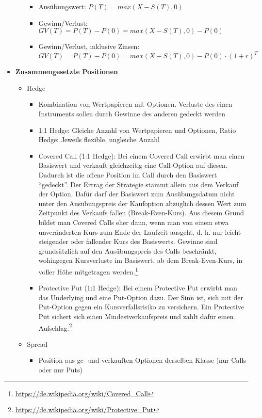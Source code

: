 \begin{itemize}
\begin{itemize}
\begin{itemize}
			\item Ausübungswert: \(P(T)=max(X-S(T),0)\)
			\item Gewinn/Verlust: \(GV(T)=P(T)-P(0) = max(X-S(T),0)-P(0)\)
			\item Gewinn/Verlust, inklusive Zinsen: \(GV(T)=P(T)-P(0) = max(X-S(T),0)-P(0) \cdot (1+r)^T\)
		\end{itemize}
	\end{itemize}
	\item \textbf{Zusammengesetzte Positionen}
	\begin{itemize}
		\item Hedge
		\begin{itemize}
			\item Kombination von Wertpapieren mit Optionen. Verluste des einen Instruments sollen durch Gewinne des anderen gedeckt werden
			\item 1:1 Hedge: Gleiche Anzahl von Wertpapieren und Optionen, Ratio Hedge: Jeweils flexible, ungleiche Anzahl
			\item Covered Call (1:1 Hedge): Bei einem Covered Call erwirbt man einen Basiswert und verkauft gleichzeitig eine Call-Option auf diesen. Dadurch ist die offene Position im Call durch den Basiswert "`gedeckt"'. Der Ertrag der Strategie stammt allein aus dem Verkauf der Option. Dafür darf der Basiswert zum Ausübungsdatum nicht unter den Ausübungspreis der Kaufoption abzüglich dessen Wert zum Zeitpunkt des Verkaufs fallen (Break-Even-Kurs). Aus diesem Grund bildet man Covered Calls eher dann, wenn man von einem etwa unveränderten Kurs zum Ende der Laufzeit ausgeht, d. h. nur leicht steigender oder fallender Kurs des Basiswerts. Gewinne sind grundsätzlich auf den Ausübungspreis des Calls beschränkt, wohingegen Kursverluste im Basiswert, ab dem Break-Even-Kurs, in voller Höhe mitgetragen werden.\footnote{\url{https://de.wikipedia.org/wiki/Covered_Call}}
			\item Protective Put (1:1 Hedge): Bei einem Protective Put erwirbt man das Underlying und eine Put-Option dazu. Der Sinn ist, sich mit der Put-Option gegen ein Kursverfallsrisiko zu versichern. Ein Protective Put sichert sich einen Mindestverkaufspreis und zahlt dafür einen Aufschlag.\footnote{\url{https://de.wikipedia.org/wiki/Protective_Put}}
		\end{itemize}
		\item Spread
		\begin{itemize}
			\item Position aus ge- und verkauften Optionen derselben Klasse (nur Calls oder nur Puts)

\end{itemize}
\end{itemize}
\end{itemize}
